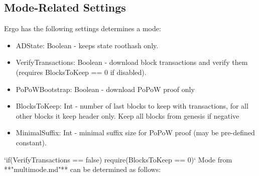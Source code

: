 \documentclass[]{article}   %
\begin{document}
\subsection{Mode-Related Settings}
Ergo has the following settings determines a mode:
\begin{itemize}
\item ADState: Boolean - keeps state roothash only.
\item VerifyTransactions: Boolean - download block transactions and verify them (requires BlocksToKeep == 0 if disabled).
\item PoPoWBootstrap: Boolean - download PoPoW proof only
\item BlocksToKeep: Int - number of last blocks to keep with transactions, for all other blocks it keep header
only. Keep all blocks from genesis if negative
\item MinimalSuffix: Int - minimal suffix size for PoPoW proof (may be pre-defined constant).
\end{itemize}
\par 
‘if(VerifyTransactions == false) require(BlocksToKeep == 0)‘ Mode from **"multimode.md"** can be determined as follows:


\end{document}
